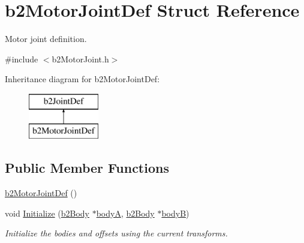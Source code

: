 \hypertarget{structb2_motor_joint_def}{}\section{b2\+Motor\+Joint\+Def Struct Reference}
\label{structb2_motor_joint_def}


Motor joint definition.  




{\ttfamily \#include $<$b2\+Motor\+Joint.\+h$>$}

Inheritance diagram for b2\+Motor\+Joint\+Def\+:\begin{figure}[H]
\begin{center}
\leavevmode
\includegraphics[height=2.000000cm]{structb2_motor_joint_def}
\end{center}
\end{figure}
\subsection*{Public Member Functions}
\begin{DoxyCompactItemize}
\item 
\mbox{\hyperlink{structb2_motor_joint_def_a70c6d6e66090cef696f401df8ce89898}{b2\+Motor\+Joint\+Def}} ()
\item 
void \mbox{\hyperlink{structb2_motor_joint_def_a90eb924b6e04da8d75d9cefad0655960}{Initialize}} (\mbox{\hyperlink{classb2_body}{b2\+Body}} $\ast$\mbox{\hyperlink{structb2_joint_def_a8cd54c93da396be75a9788f2c6897f05}{bodyA}}, \mbox{\hyperlink{classb2_body}{b2\+Body}} $\ast$\mbox{\hyperlink{structb2_joint_def_aa4f4dee2fbcd12187b19506b60e68e3d}{bodyB}})
\begin{DoxyCompactList}\small\item\em Initialize the bodies and offsets using the current transforms. \end{DoxyCompactList}\end{DoxyCompactItemize}
